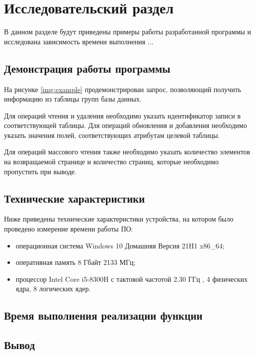 \chapter{Исследовательский раздел}

В данном разделе будут приведены примеры работы разработанной программы и исследована зависимость времени выполнения ...

\section{Демонстрация работы программы}

На рисунке \ref{img:example} продемонстрирован запрос, позволяющий получить информацию из таблицы групп базы данных.


Для операций чтения и удаления необходимо указать идентификатор записи в соответствующей таблицы. Для операций обновления и добавления необходимо указать значения полей, соответствующих атрибутам целевой таблицы.

Для операций массового чтения также необходимо указать количество элементов на возвращаемой странице и количество страниц, которые необходимо пропустить при выводе.

\section{Технические характеристики}

Ниже приведены технические характеристики устройства, на котором было проведено измерение времени работы ПО:

\begin{itemize}
	\item операционная система Windows 10 Домашняя Версия 21H1 \cite{windows} x86\_64;
	\item оперативная память 8 Гбайт 2133 МГц;
	\item процессор Intel Core i5-8300H с тактовой частотой 2.30 ГГц \cite{intel}, 4 физических ядра, 8 логических ядер.
\end{itemize}

\section{Время выполнения реализации функции}


\section*{Вывод}



